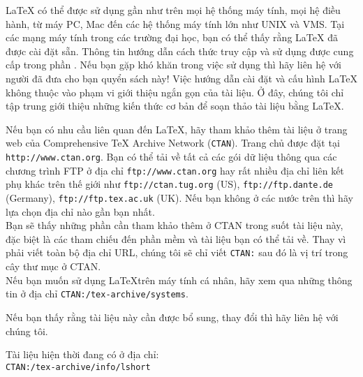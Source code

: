 \bigskip
\noindent \LaTeX{} có thể được sử dụng gần như trên mọi hệ thống máy tính, mọi hệ điều hành,
từ máy PC, Mac đến các hệ thống máy tính lớn như UNIX và VMS. Tại các mạng máy tính trong các trường đại học, bạn có thể thấy rằng \LaTeX{} đã được cài đặt sẵn. Thông tin hướng dẫn cách thức truy cập và sử dụng được cung cấp trong phần \guide. Nếu bạn gặp khó khăn trong việc sử dụng thì hãy liên hệ với người đã đưa cho bạn quyển sách này! Việc hướng dẫn cài đặt và cấu hình \LaTeX{} không thuộc vào phạm vi giới thiệu ngắn gọn của tài liệu. Ở đây, chúng tôi chỉ tập trung giới thiệu những kiến thức cơ bản  để soạn thảo tài liệu bằng \LaTeX{}.

\bigskip
\noindent Nếu bạn có nhu cầu liên quan đến \LaTeX{}, hãy tham khảo thêm tài liệu ở trang web của Comprehensive \TeX{}
Archive Network (\texttt{CTAN}). Trang chủ được đặt tại \texttt{http://www.ctan.org}. Bạn có thể tải về tất cả các gói dữ
liệu thông qua các chương trình FTP ở địa chỉ \texttt{ftp://www.ctan.org} hay rất nhiều địa chỉ liên kết phụ khác trên thế giới như \texttt{ftp://ctan.tug.org} (US), \texttt{ftp://ftp.dante.de} (Germany), \texttt{ftp://ftp.tex.ac.uk} (UK). Nếu bạn không ở các nước trên thì hãy lựa chọn địa chỉ nào gần bạn nhất.\\

\noindent Bạn sẽ thấy những phần cần tham khảo thêm ở CTAN trong suốt tài liệu này, đặc biệt là các tham chiếu đến phần mềm và tài liệu bạn có thể tải về. Thay vì phải viết toàn bộ địa chỉ URL, chúng tôi sẽ chỉ viết \texttt{CTAN:} sau đó là vị trí  trong cây thư mục ở CTAN.\\

\noindent Nếu bạn muốn sử dụng \LaTeX trên máy tính cá nhân, hãy xem qua
những thông tin ở địa chỉ \texttt{CTAN:/tex-archive/systems}.


\noindent Nếu bạn thấy rằng tài liệu này cần được bổ sung, thay đổi
thì hãy liên hệ với chúng tôi.

\bigskip
\begin{verse}
%
\end{verse}

\noindent Tài liệu hiện thời đang có ở địa chỉ: \\
\texttt{CTAN:/tex-archive/info/lshort}

\endinput
%
